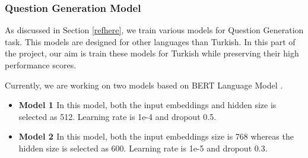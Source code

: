 \documentclass{mefsdp}
\begin{document}
	\subsubsection{Question Generation Model}\label{qgmodel-design}
	As discussed in Section \ref{refhere}, we train various models for Question Generation task. This models are designed for other languages than Turkish. In this part of the project, our aim is train these models for Turkish while preserving their high performance scores. \newline \par
	
	Currently, we are working on two models based on BERT Language Model \cite{vaswani2017attention}.
	
	\begin{itemize}
		\item \textbf{Model 1 \cite{rosasco_question_2020}} In this model, both the input embeddings and hidden size is selected as 512. Learning rate is 1e-4 and dropout 0.5.

		\item \textbf{Model 2 \cite{zhang2019addressing}}
		In this model, both the input embeddings size is 768 whereas the hidden size is selected as 600. Learning rate is 1e-5 and dropout 0.3.
	\end{itemize}
\end{document}

